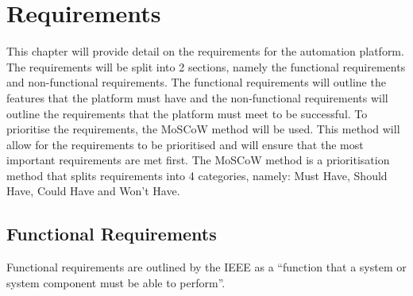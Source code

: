 \chapter{Requirements}
\label{chap:requirements}

This chapter will provide detail on the requirements for the automation
platform. The requirements will be split into 2 sections, namely the functional
requirements and non-functional requirements. The functional requirements
will outline the features that the platform must have and the non-functional
requirements will outline the requirements that the platform must meet to be successful.
To prioritise the requirements, the MoSCoW method will be used. This method will allow for the requirements to be prioritised and will ensure that
the most important requirements are met first. The MoSCoW method is a
prioritisation method that splits requirements into 4 categories, namely: Must
Have, Should Have, Could Have and Won’t Have.
\section{Functional Requirements}
Functional requirements are outlined by the IEEE as a ``function that a system or system component must be able to perform''. \citep{159342}

